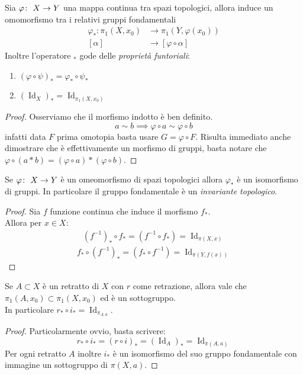 \begin{theorem}
	Sia $\varphi \colon\ X \rightarrow Y$ una mappa continua tra spazi topologici, allora induce un omomorfismo tra i relativi gruppi fondamentali 
	\begin{align*}
	\varphi_*:\pi_1(X, x_0)&\to\pi_1(Y, \varphi(x_0))\\
	[\alpha] &\to [\varphi \circ \alpha]
	\end{align*}
	Inoltre l'operatore $_*$ gode delle \textit{proprietà funtoriali}:
	\begin{enumerate}
		\item $(\varphi \circ \psi)_* = \varphi_* \circ \psi_*$
		\item $(\operatorname{Id}_{X})_* = \operatorname{Id}_{\pi_1(X, x_0)}$ 
	\end{enumerate}
\end{theorem}
\begin{proof} Osserviamo che il morfismo indotto è ben definito.  
	\begin{equation*}
	a \sim b \implies \varphi\circ a \sim \varphi\circ b
	\end{equation*}
	infatti data $F$ prima omotopia basta usare $G=\varphi\circ F$. Risulta immediato anche dimostrare che è effettivamente un morfismo di gruppi, basta notare che $\varphi\circ(a*b)=(\varphi\circ a)*(\varphi\circ b)$.
\end{proof}

\begin{corollary}
	Se $\varphi \colon\ X \rightarrow Y$ è un omeomorfismo di spazi topologici allora $\varphi_*$ è un isomorfismo di gruppi. In particolare il gruppo fondamentale è un \textit{invariante topologico}.
\end{corollary}

\begin{proof}
	Sia $f$ funzione continua che induce il morfismo $f_*$. \\ Allora per $x\in X$:
	\begin{align*}
	\left(f^{-1}\right)_*\circ f_* = \left(f^{-1}\circ f_*\right)=\operatorname{Id}_{\pi({X,x})}
	\end{align*}
	\begin{align*}
	f_*\circ\left(f^{-1}\right)_*  = \left(f_*\circ f^{-1} \right)=\operatorname{Id}_{\pi({Y,f(x)})}
	\end{align*}
\end{proof}

\begin{theorem}
	Se $A \subset X$ è un retratto di $X$ con $r$ come retrazione, allora vale che $\pi_1(A, x_0) \subset \pi_1(X, x_0)$ ed è un sottogruppo.  \\ In particolare $r_*\circ i_* =\operatorname{Id}_{\pi_{A,a}}$.
\end{theorem}
	\begin{proof}Particolarmente ovvio, basta scrivere:
		\begin{equation*}
		r_*\circ i_* =(r\circ i)_* = (\operatorname{Id}_{A})_*=\operatorname{Id}_{\pi({A,a})}
		\end{equation*}
		Per ogni retratto $A$ inoltre $i_*$ è un isomorfismo del suo gruppo fondamentale con immagine un sottogruppo di $\pi(X,a)$.
	\end{proof}

